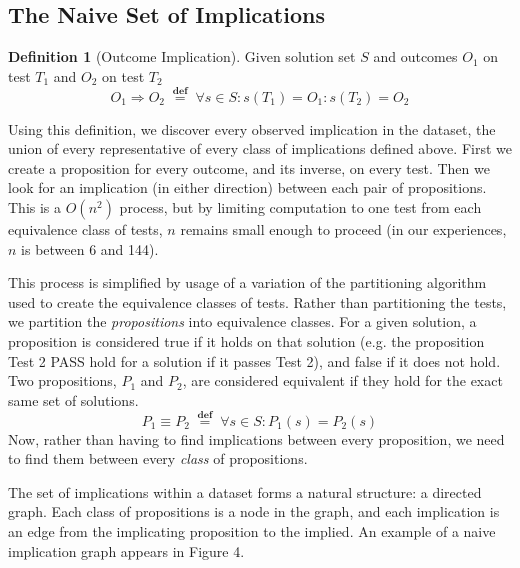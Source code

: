 \documentclass[11pt,twoside]{article}
\newcommand\defined{\mathrel{\;\stackrel{\scriptscriptstyle\mathbf{def}}{=}\;}}
\theoremstyle{definition}
\newtheorem{defn}{Definition}
\begin{document}
\subsection{The Naive Set of Implications}
\begin{defn}[Outcome Implication]
Given solution set $S$ and outcomes $O_1$ on test $T_1$ and $O_2$ on test $T_2$
$$O_1 \Rightarrow O_2 \defined \forall s \in S : s(T_1) = O_1 : s(T_2) = O_2$$
\end{defn}

Using this definition, we discover every observed implication in the dataset, the union of every representative of every class of implications defined above. First we create a proposition for every outcome, and its inverse, on every test. Then we look for an implication (in either direction) between each pair of propositions. This is a $O(n^2)$ process, but by limiting computation to one test from each equivalence class of tests, $n$ remains small enough to proceed (in our experiences, $n$ is between 6 and 144).

This process is simplified by usage of a variation of the partitioning algorithm used to create the equivalence classes of tests. Rather than partitioning the tests, we partition the \emph{propositions} into equivalence classes. For a given solution, a proposition is considered true if it holds on that solution (e.g. the proposition Test 2 PASS hold for a solution if it passes Test 2), and false if it does not hold. Two propositions, $P_1$ and $P_2$, are considered equivalent if they hold for the exact same set of solutions.
$$P_1 \equiv P_2 \defined \forall s \in S : P_1(s) = P_2(s)$$
Now, rather than having to find implications between every proposition, we need to find them between every \emph{class} of propositions.

The set of implications within a dataset forms a natural structure: a directed graph. Each class of propositions is a node in the graph, and each implication is an edge from the implicating proposition to the implied. An example of a naive implication graph appears in Figure 4.
\end{document}
